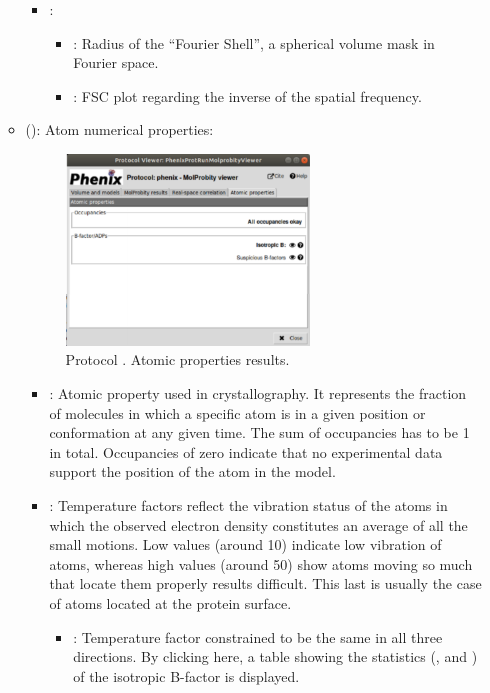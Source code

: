 \begin{itemize}
\begin{itemize}
\begin{itemize}
         \item {}:
          \begin{itemize}
           \item {}: Radius of the ``Fourier Shell'', a spherical volume mask in Fourier space.
           \item {}: FSC plot regarding the inverse of the spatial frequency.
          \end{itemize}
        \end{itemize}
      \item {} (): Atom numerical properties:
       \begin{figure}[H]
         \centering 
         \captionsetup{width=.7\linewidth} 
         \includegraphics[width=0.65\textwidth]{Images_appendix/Fig147.pdf}
         \caption{Protocol . Atomic properties results.}
         \label{fig:app_protocol_molprobity_5}
        \end{figure}
        \begin{itemize}
         \item {}: Atomic property used in crystallography. It represents the fraction of molecules in which a specific atom is in a given position or conformation at any given time. The sum of occupancies has to be 1 in total. Occupancies of zero indicate that no experimental data support the position of the atom in the model.
         \item {}: Temperature factors reflect the vibration status of the atoms in which the observed electron density constitutes an average of all the small motions. Low values (around 10) indicate low vibration of atoms, whereas high values (around 50) show atoms moving so much that locate them properly results difficult. This last is usually the case of atoms located at the protein surface.
          \begin{itemize}
           \item {}: Temperature factor constrained to be the same in all three directions. By clicking here, a table showing the statistics (,  and ) of the isotropic B-factor is displayed.
          \end{itemize}
        \end{itemize}
    \end{itemize}
    

\end{itemize}
